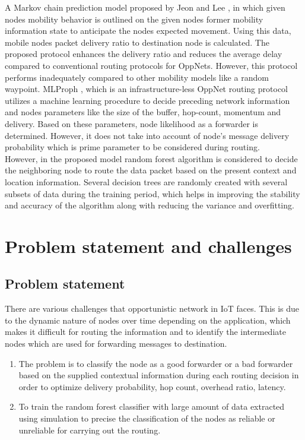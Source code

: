 \documentclass[10pt,journal]{IEEEtran}
\begin{document}
A  Markov chain prediction model proposed by Jeon and Lee \cite{2016dmcpm}, in which given nodes mobility behavior is outlined on the given nodes former mobility information state to anticipate the nodes expected movement. Using this data, mobile nodes packet delivery ratio to destination node is calculated. The proposed protocol enhances the delivery ratio and reduces the average delay compared to conventional routing protocols for OppNets. However, this protocol performs inadequately compared to other mobility models like a random waypoint.  
MLProph \cite{2016mlbp}, which is an infrastructure-less OppNet routing protocol utilizes a machine learning procedure to decide preceding network information and nodes parameters like the size of the buffer, hop-count, momentum and delivery. Based on these parameters, node likelihood as a forwarder is determined. However, it does not take into account of node's message delivery probability which is prime parameter to be considered during routing.\\
However, in the proposed model random forest algorithm is considered to decide the neighboring node to route the data packet based on the present context and location information. Several decision trees are randomly created with several subsets of data during the training period, which helps in improving the stability and accuracy of the algorithm along with reducing the variance and overfitting.

\section{Problem statement and challenges}
\subsection{Problem statement}
There are various challenges that opportunistic network in IoT faces. This is due to the dynamic nature of nodes over time depending on the application, which makes it difficult for routing the information and to identify the intermediate nodes which are used for forwarding messages to destination.
 \begin {enumerate}

\item The problem is to classify the node as a good forwarder or a bad forwarder based on the supplied contextual information during each routing decision in order to optimize delivery probability, hop count, overhead ratio, latency.

\item To train the random forest classifier with large amount of data extracted using simulation to precise the classification of the nodes as reliable or unreliable for carrying out the routing.

\end{enumerate}
\end{document}
